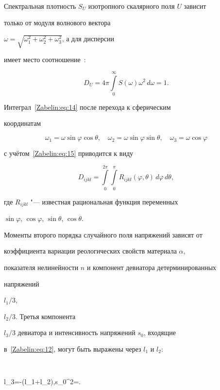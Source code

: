 Спектральная плотность $S_U$ изотропного скалярного поля $U$ зависит

только от модуля волнового вектора

$\omega=\sqrt{\omega_1^2+\omega_2^2+\omega_3^2}$, а для дисперсии

имеет место соотношение~\cite{Zabelin:bib:07}:

\begin{equation}\label{Zabelin:eq:15}

D_U=4\pi\int\limits_0^\infty S(\omega)\omega^2\,d\omega=1.

\end{equation}



Интеграл~\eqref{Zabelin:eq:14} после перехода к сферическим

координатам

$$

\omega_1=\omega\sin\varphi\cos\theta,\quad\omega_2=\omega\sin\varphi\sin\theta,\quad

\omega_3=\omega\cos\varphi

$$

с учётом~\eqref{Zabelin:eq:15} приводится к виду

$$

D_{ijkl}=\int\limits_0^{2\pi}\int\limits_0^\pi

R_{ijkl}(\varphi,\theta)\,d\varphi\,d\theta,

$$

где $R_{ijkl}$ "--- известная рациональная функция переменных

$\sin\varphi$, $\cos\varphi$, $\sin\theta$, $\cos\theta$.



Моменты второго порядка случайного поля напряжений зависят от

коэффициента вариации реологических свойств материала $\alpha$,

показателя нелинейности $n$ и компонент девиатора детерминированных

напряжений

${l_1}/{3}$,

${l_2}/{3}$. Третья компонента

${l_3}/{3}$  девиатора и интенсивность напряжений $s_0$, входящие

в~\eqref{Zabelin:eq:12}, могут быть выражены через $l_1$ и $l_2$:

$$

l_3=-(l_1+l_2),\quad s_0^{2}=.

